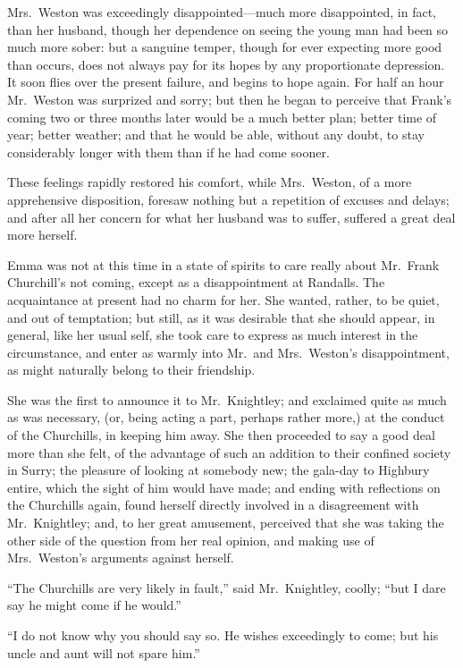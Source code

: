 Mrs.\ Weston was exceedingly disappointed---much more disappointed,
in fact, than her husband, though her dependence on seeing the
young man had been so much more sober:  but a sanguine temper,
though for ever expecting more good than occurs, does not
always pay for its hopes by any proportionate depression.
It soon flies over the present failure, and begins to hope again.
For half an hour Mr.\ Weston was surprized and sorry; but then he
began to perceive that Frank's coming two or three months later
would be a much better plan; better time of year; better weather;
and that he would be able, without any doubt, to stay considerably
longer with them than if he had come sooner.

These feelings rapidly restored his comfort, while Mrs.\ Weston,
of a more apprehensive disposition, foresaw nothing but a repetition
of excuses and delays; and after all her concern for what her husband
was to suffer, suffered a great deal more herself.

Emma was not at this time in a state of spirits to care really
about Mr.\ Frank Churchill's not coming, except as a disappointment
at Randalls.  The acquaintance at present had no charm for her.
She wanted, rather, to be quiet, and out of temptation; but still, as it
was desirable that she should appear, in general, like her usual self,
she took care to express as much interest in the circumstance,
and enter as warmly into Mr.\ and Mrs.\ Weston's disappointment,
as might naturally belong to their friendship.

She was the first to announce it to Mr.\ Knightley; and exclaimed
quite as much as was necessary, (or, being acting a part, perhaps
rather more,) at the conduct of the Churchills, in keeping him away.
She then proceeded to say a good deal more than she felt, of the
advantage of such an addition to their confined society in Surry;
the pleasure of looking at somebody new; the gala-day to Highbury entire,
which the sight of him would have made; and ending with reflections
on the Churchills again, found herself directly involved in a
disagreement with Mr.\ Knightley; and, to her great amusement,
perceived that she was taking the other side of the question from her
real opinion, and making use of Mrs.\ Weston's arguments against herself.

``The Churchills are very likely in fault,'' said Mr.\ Knightley,
coolly; ``but I dare say he might come if he would.''

``I do not know why you should say so.  He wishes exceedingly to come;
but his uncle and aunt will not spare him.''

